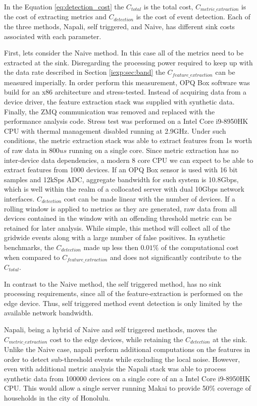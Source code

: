 In the Equation \ref{eq:detection_cost} the $C_{total}$ is the total cost, $C_{metric\_extraction}$ is the cost of extracting metrics and $C_{detection}$ is the cost of event detection.\cite{de2015effective}
Each of the three methods, Napali, self triggered, and Naive, has different sink costs associated with each parameter.

First, lets consider the Naive method.
In this case all of the metrics need to be extracted at the sink.
Disregarding the processing power required to keep up with the data rate described in Section \ref{iexp:sec:band} the $C_{feature\_extraction}$ can be measured imperially.
In order perform this measurement, OPQ Box software was build for an x86 architecture and stress-tested.
Instead of acquiring data from a device driver, the feature extraction stack was supplied with synthetic data.
Finally, the ZMQ communication was removed and replaced with the performance analysis code.
Stress test was performed on a Intel Core i9-8950HK CPU with thermal management disabled running at 2.9GHz.
Under such conditions, the metric extraction stack was able to extract features from 1s worth of raw data in $800us$ running on a single core.
Since metric extraction has no inter-device data dependencies, a modern 8 core CPU we can expect to be able to extract features from 1000 devices.
If an OPQ Box sensor is used with 16 bit samples and 12kSps ADC, aggregate bandwidth for such system is 10.8Gbps, which is well within the realm of a collocated server with dual 10Gbps network interfaces.
$C_{detection}$ cost can be made linear with the number of devices.
If a rolling window is applied to metrics as they are generated, raw data from all devices contained in the window with an offending threshold metric can be retained for later analysis.
While simple, this method will collect all of the gridwide events along with a large number of false positives.
In synthetic benchmarks, the $C_{detection}$ made up less then $0.01\%$ of the computational cost when compared to $C_{feature\_extraction}$
and does not significantly contribute to the $C_{total}$.


In contrast to the Naive method, the self triggered method, has no sink processing requirements, since all of the feature-extraction is performed on the edge device.
Thus, self triggered method event detection is only limited by the available network bandwidth.

Napali, being a hybrid of Naive and self triggered methods, moves the $C_{metric\_extraction}$ cost to the edge devices, while retaining
the $C_{detection}$ at the sink.
Unlike the Naive case, napali perform additional computations on the features in order to detect sub-threshold events while excluding the local noise.
However, even with additional metric analysis the Napali stack was able to process synthetic data from 100000 devices on a single core of an a Intel Core i9-8950HK CPU.
This would allow a single server running Makai to provide 50\% coverage of households in the city of Honolulu.

